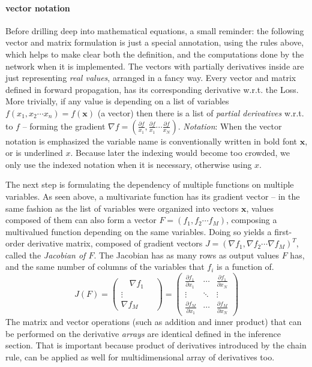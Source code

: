 \paragraph{vector notation}
Before drilling deep into mathematical equations, a small reminder: the following vector and matrix formulation is just a special annotation, 
using the rules above, which helps to make clear both the definition, and the computations done by the network when it is implemented. 
The vectors with partially derivatives inside are just representing \emph{real values}, arranged in a fancy way.
Every vector and matrix defined in forward propagation, has its corresponding derivative w.r.t. the Loss.
More trivially, if any value is depending on a list of variables $f(x_1, x_2 \cdots x_n) = f(\mathbf{x})$ (a vector) then there is a list of \emph{partial derivatives} w.r.t. to $f$ -- forming the gradient $\nabla f = \left(\frac{\partial f}{x_1}, \frac{\partial f}{x_1} \cdots \frac{\partial f}{x_N}\right)$. 
\emph{Notation}: When the vector notation is emphasized the variable name is conventionally written in bold font $\mathbf{x}$, or is underlined \underline{$x$}.
Because later the indexing would become too crowded, we only use the indexed notation when it is necessary, otherwise using $x$.

The next step is formulating the dependency of multiple functions on multiple variables.
As seen above, a multivariate function has its gradient vector --
in the same fashion as the list of variables were organized into vectors $\mathbf{x}$, values composed of them can also form a vector $F = (f_1, f_2 \cdots f_M)$, composing a multivalued function depending on the same variables.
Doing so yields a first-order derivative matrix, composed of gradient vectors $J=(\nabla f_1, \nabla f_2 \cdots \nabla f_M)^T$, called the \emph{Jacobian of $F$}.
The Jacobian has as many rows as output values $F$ has, and the same number of columns of the variables that $f_i$ is a function of.
$$
    J(F) = 
    \begin{pmatrix}
    \quad \nabla f_1 \quad \\ 
    \vdots \\ 
    \nabla f_M
    \end{pmatrix} 
    =
    \begin{pmatrix}
    \frac{\partial f_1}{\partial x_1} & \cdots & \frac{\partial f_1}{\partial x_N} \\ 
    \vdots & \ddots & \vdots \\ 
    \frac{\partial f_M}{\partial x_1} & \cdots & \frac{\partial f_M}{\partial x_N}
    \end{pmatrix} 
$$
The matrix and vector operations (such as addition and inner product) that can be performed on the derivative \emph{arrays} are identical defined in the inference section. That is important because product of derivatives introduced by the chain rule, can be applied as well for multidimensional array of derivatives too.

